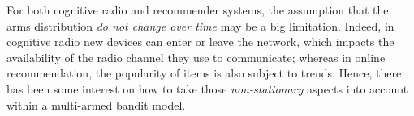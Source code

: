 

%
For both cognitive radio and recommender systems, the assumption that the arms distribution \emph{do not change over time} may be a big limitation. Indeed, in cognitive radio new devices can enter or leave the network, which impacts the availability of the radio channel they use to communicate; whereas in online recommendation, the popularity of items is also subject to trends. Hence, there has been some interest on how to take those \emph{non-stationary} aspects into account within a multi-armed bandit model.

